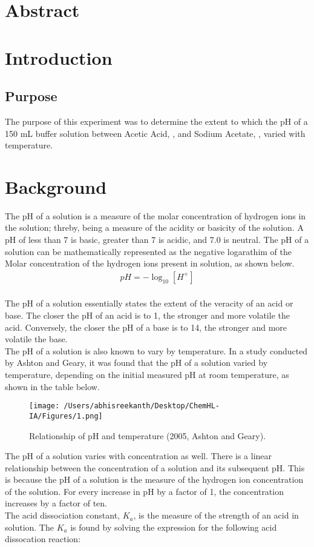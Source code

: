 \documentclass{article}
\begin{document}

\section*{Abstract}

\section*{Introduction} %
\subsection*{Purpose}
The purpose of this experiment was to determine the extent to which the pH of a 150 mL buffer solution between Acetic Acid, , and Sodium Acetate, , varied with temperature. 

\section*{Background}%
The pH of a solution is a measure of the molar concentration of hydrogen ions in the solution; threby, being a measure of the acidity or basicity of the solution. A pH of less than 7 is basic, greater than 7 is acidic, and 7.0 is neutral. The pH of a solution can be mathematically represented as the negative logarathim of the Molar concentration of the hydrogen ions present in solution, as shown below. 
\begin{eqnarray*}
pH = -\log_{10}[H^+]
\end{eqnarray*} \\
\noindent
The pH of a solution essentially states the extent of the veracity of an acid or base. The closer the pH of an acid is to 1, the stronger and more volatile the acid. Conversely, the closer the pH of a base is to 14, the stronger and more volatile the base. \\
\noindent
The pH of a solution is also known to vary by temperature. In a study conducted by Ashton and Geary, it was found that the pH of a solution varied by temperature, depending on the initial measured pH at room temperature, as shown in the table below. 
\begin{figure}[H]
	\centering
	\texttt{[image: /Users/abhisreekanth/Desktop/ChemHL-IA/Figures/1.png]}
	\caption{Relationship of pH and temperature (2005, Ashton and Geary).}
\end{figure} 
\noindent
The pH of a solution varies with concentration as well. There is a linear relationship between the concentration of a solution and its subsequent pH. This is because the pH of a solution is the measure of the hydrogen ion concentration of the solution. For every increase in pH by a factor of 1, the concentration increases by a factor of ten. \\
\noindent
The acid dissociation constant, $K_a$, is the measure of the strength of an acid in solution. The $K_a$ is found by solving the expression for the following acid dissocation reaction: \\
\end{document}
